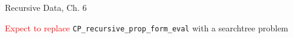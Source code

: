 \documentclass[handout]{mcs}
\begin{document}

\begin{staffnotes}
Recursive Data, Ch. 6

\textcolor{red}{Expect to replace} \verb|CP_recursive_prop_form_eval| with a searchtree problem
\end{staffnotes}



\end{document}
